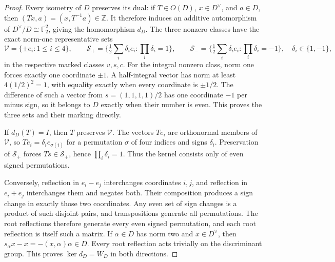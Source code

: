 \begin{proof}
Every isometry of \(D\) preserves its dual: if \(T\in O(D)\),
\(x\in D^\vee\), and \(a\in D\), then
\((Tx,a)=(x,T^{-1}a)\in\mathbb Z\).
It therefore induces an additive automorphism of
\(D^\vee/D\cong\mathbb F_2^2\), giving the homomorphism \(d_D\).
The three nonzero classes have the exact norm-one representative sets
\[
 \mathcal V=\{\pm e_i:1\le i\le4\},\qquad
 \mathcal S_+=\{\tfrac12\textstyle\sum_i\delta_i e_i:
                                      \prod_i\delta_i=1\},\qquad
 \mathcal S_-=\{\tfrac12\textstyle\sum_i\delta_i e_i:
                                      \prod_i\delta_i=-1\},
 \quad \delta_i\in\{1,-1\},
\]
in the respective marked classes \(v,s,c\).
For the integral nonzero class, norm one forces exactly one coordinate
\(\pm1\).  A half-integral vector has norm at least
\(4(1/2)^2=1\), with equality exactly when every coordinate is
\(\pm1/2\).  The difference of such a vector from
\(s=(1,1,1,1)/2\) has one coordinate \(-1\) per minus sign,
so it belongs to \(D\) exactly when their number is even.
This proves the three sets and their marking directly.

If \(d_D(T)=I\), then \(T\) preserves \(\mathcal V\).
The vectors \(Te_i\) are orthonormal members of \(\mathcal V\),
so \(Te_i=\delta_i e_{\sigma(i)}\) for a permutation \(\sigma\)
of four indices and signs \(\delta_i\).  Preservation of
\(\mathcal S_+\) forces \(Ts\in\mathcal S_+\), hence
\(\prod_i\delta_i=1\).  Thus the kernel consists only of even
signed permutations.

Conversely, reflection in \(e_i-e_j\) interchanges coordinates
\(i,j\), and reflection in \(e_i+e_j\) interchanges them and
negates both.  Their composition produces a sign change in exactly
those two coordinates.  Any even set of sign changes is a product of
such disjoint pairs, and transpositions generate all permutations.
The root reflections therefore generate every even signed permutation,
and each root reflection is itself such a matrix.  If
\(\alpha\in D\) has norm two and \(x\in D^\vee\), then
\(s_\alpha x-x=-(x,\alpha)\alpha\in D\).  Every root reflection
acts trivially on the discriminant group.  This proves
\(\ker d_D=W_D\) in both directions.


\end{proof}
